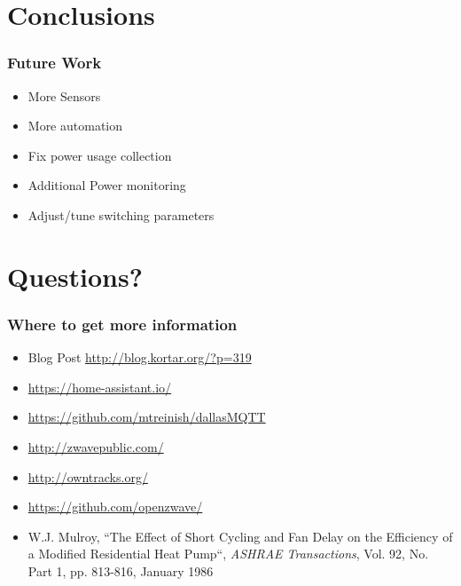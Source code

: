 \documentclass[aspectratio=169,11pt,hyperref={colorlinks=true}]{beamer}
\begin{document}
\section{Conclusions}
\begin{frame}
    \frametitle{Future Work}
    \begin{itemize}
        \item More Sensors
        \item More automation
        \item Fix power usage collection
        \item Additional Power monitoring
        \item Adjust/tune switching parameters
    \end{itemize}
\end{frame}

\section{Questions?}
\begin{frame}
\frametitle{Where to get more information}
    \begin{itemize}
        \item Blog Post \href{http://blog.kortar.org/?p=319}{http://blog.kortar.org/?p=319}
        \item \href{https://home-assistant.io/}{https://home-assistant.io/}
        \item \href{https://github.com/mtreinish/dallasMQTT}{https://github.com/mtreinish/dallasMQTT}
        \item \href{http://zwavepublic.com/}{http://zwavepublic.com/}
        \item \href{http://owntracks.org/}{http://owntracks.org/}
        \item \href{https://github.com/openzwave/}{https://github.com/openzwave/}
        \item W.J. Mulroy, ``The Effect of Short Cycling and Fan Delay on the Efficiency of a Modified Residential Heat Pump``, \textit{ASHRAE Transactions}, Vol. 92, No. Part 1, pp. 813-816, January 1986
    \end{itemize}
\end{frame}
\end{document}
